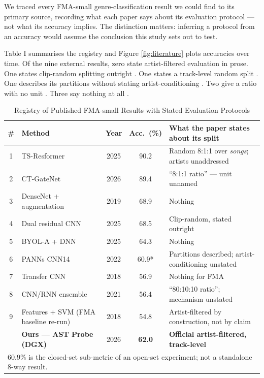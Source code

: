 \documentclass[conference]{IEEEtran}
\begin{document}
We traced every FMA-small genre-classification result we could find to
its primary source, recording what each paper says about its evaluation
protocol --- not what its accuracy implies. The distinction matters:
inferring a protocol from an accuracy would assume the conclusion this
study sets out to test.

Table I summarises the registry and Figure \ref{fig:literature} plots
accuracies over time. Of the nine external results, zero state
artist-filtered evaluation in prose. One states clip-random splitting
outright \citep{ashraf2025music}. One states a track-level random split
\citep{zhang2025tsresformer}. One describes its partitions without
stating artist-conditioning \citep{liu2022openset}. Two give a ratio
with no unit \citep{ma2026ctgatenet, kostrzewa2021music}. Three say
nothing at all
\citep{bian2019audio, rai2025evaluating, park2018representation}.

\begin{table}[t]
\centering
\caption{Registry of Published FMA-small Results with Stated Evaluation Protocols}
\label{tab:literature}
\footnotesize
\begin{tabular}{clccl}
\toprule
\textbf{\#} & \textbf{Method} & \textbf{Year} & \textbf{Acc.\ (\%)} & \textbf{What the paper states about its split} \\
\midrule
1 & TS-Resformer \cite{zhang2025tsresformer} & 2025 & 90.2 & Random 8:1:1 over \emph{songs}; artists unaddressed \\
2 & CT-GateNet \cite{ma2026ctgatenet} & 2026 & 89.4 & ``8:1:1 ratio'' --- unit unnamed \\
3 & DenseNet + augmentation \cite{bian2019audio} & 2019 & 68.9 & Nothing \\
4 & Dual residual CNN \cite{ashraf2025music} & 2025 & 68.5 & Clip-random, stated outright \\
5 & BYOL-A + DNN \cite{rai2025evaluating} & 2025 & 64.3 & Nothing \\
6 & PANNs CNN14 \cite{liu2022openset} & 2022 & 60.9* & Partitions described; artist-conditioning unstated \\
7 & Transfer CNN \cite{park2018representation} & 2018 & 56.9 & Nothing for FMA \\
8 & CNN/RNN ensemble \cite{kostrzewa2021music} & 2021 & 56.4 & ``80:10:10 ratio''; mechanism unstated \\
9 & Features + SVM (FMA baseline re-run) \cite{park2018representation} & 2018 & 54.8 & Artist-filtered by construction, not by claim \\
\midrule
  & \textbf{Ours --- AST Probe (DGX)} & 2026 & \textbf{62.0} & \textbf{Official artist-filtered, track-level} \\
\bottomrule
\multicolumn{5}{l}{\footnotesize *60.9\% is the closed-set sub-metric of an open-set experiment; not a standalone 8-way result.}
\end{tabular}
\end{table}
\end{document}
